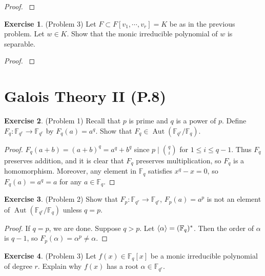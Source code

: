 \documentclass[12pt, psamsfonts]{amsart}
\theoremstyle{definition}
\newtheorem*{exer}{Exercise}
\theoremstyle{remark}
\DeclareMathOperator{\Aut}{Aut}
\numberwithin{equation}{section}
\begin{document}
\begin{proof}
  $ $
\end{proof}

\begin{exer}{(Problem 3)}
  Let $F \subset F[v_1, \cdots, v_r] = K$ be as in the previous problem.
  Let $w \in K$.
  Show that the monic irreducible polynomial of $w$ is separable.
\end{exer}

\begin{proof}
$ $
\end{proof}

\section{Galois Theory II (P.8)}

\begin{exer}{(Problem 1)}
  Recall that $p$ is prime and $q$ is a power of $p$.
  Define $F_q: \mathbb{F}_{q^r} \rightarrow \mathbb{F}_{q^r}$ by $F_q(a) = a^q$.
  Show that $F_q \in \Aut(\mathbb{F}_{q^r}/\mathbb{F}_q)$.
\end{exer}

\begin{proof}
  $F_q(a + b) = (a + b)^q = a^q + b^q$ since $p \mid \binom{q}{i}$ for $1 \leq i \leq q - 1$.
  Thus $F_q$ preserves addition, and it is clear that $F_q$ preserves multiplication, so $F_q$ is a homomorphism.
  Moreover, any element in $\mathbb{F}_q$ satisfies $x^q - x = 0$, so $F_q(a) = a^q = a$ for any $a \in \mathbb{F}_q$.
\end{proof}

\begin{exer}{(Problem 2)}
  Show that $F_p: \mathbb{F}_{q^r} \rightarrow \mathbb{F}_{q^r}$, $F_p(a) = a^p$ is not an element of $\Aut(\mathbb{F}_{q^r} / \mathbb{F}_q)$ unless $q = p$.
\end{exer}

\begin{proof}
  If $q = p$, we are done.
  Suppose $q > p$.
  Let $\ev{\alpha} = (\mathbb{F}_{q})^{*}$.
  Then the order of $\alpha$ is $q - 1$, so $F_p(\alpha) = \alpha^p \ne \alpha$.
\end{proof}

\begin{exer}{(Problem 3)}
  Let $f(x) \in \mathbb{F}_q[x]$ be a monic irreducible polynomial of degree $r$.
  Explain why $f(x)$ has a root $\alpha \in \mathbb{F}_{q^r}$.
\end{exer}
\end{document}
